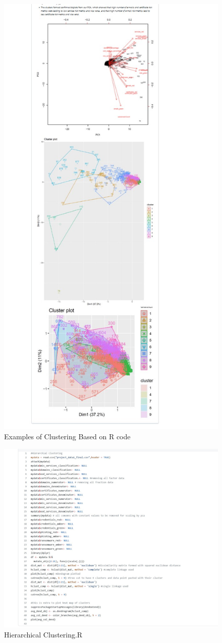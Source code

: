 \begin{figure}[ht]
\centering
\includegraphics[angle=0,width=.7\linewidth]{GitAssignmentClustering.jpg}
\caption{Examples of Clustering Based on R code} 
\label{fig:view}
\end{figure}
\bigskip


\begin{figure}[ht]
\centering
\includegraphics[angle=0,width=.7\linewidth]{R-Code-Her.jpg}
\caption{Hierarchical Clustering.R} 
\label{fig:view}
\end{figure}
\bigskip


